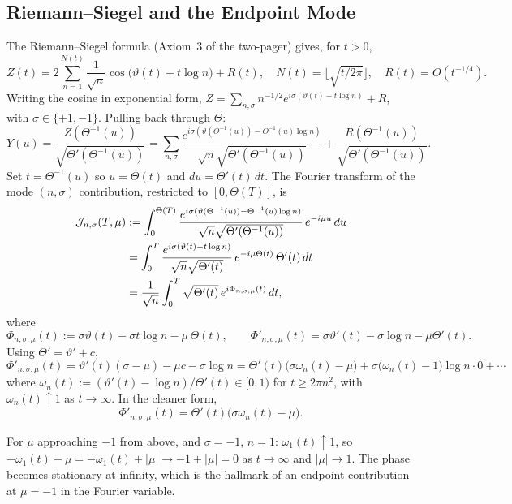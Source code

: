 \documentclass[11pt,a4paper]{article}
\theoremstyle{plain}
\theoremstyle{definition}
\begin{document}
\subsection{Riemann--Siegel and the Endpoint Mode}

The Riemann--Siegel formula (Axiom~3 of the two-pager) gives, for $t>0$,
\[
Z(t)=2\sum_{n=1}^{N(t)}\frac{1}{\sqrt n}\cos\!\big(\vartheta(t)-t\log n\big)+R(t),
\quad N(t)=\lfloor\sqrt{t/2\pi}\rfloor,
\quad R(t)=O(t^{-1/4}).
\]
Writing the cosine in exponential form, $Z=\sum_{n,\sigma}n^{-1/2}e^{i\sigma(\vartheta(t)-t\log n)}+R$, with $\sigma\in\{+1,-1\}$. Pulling back through $\Theta$:
\[
Y(u)=\frac{Z(\Theta^{-1}(u))}{\sqrt{\Theta'(\Theta^{-1}(u))}}
=\sum_{n,\sigma}\frac{e^{i\sigma(\vartheta(\Theta^{-1}(u))-\Theta^{-1}(u)\log n)}}{\sqrt{n}\sqrt{\Theta'(\Theta^{-1}(u))}}
+\frac{R(\Theta^{-1}(u))}{\sqrt{\Theta'(\Theta^{-1}(u))}}.
\]
Set $t=\Theta^{-1}(u)$ so $u=\Theta(t)$ and $du=\Theta'(t)\,dt$. The Fourier transform of the mode $(n,\sigma)$ contribution, restricted to $[0,\Theta(T)]$, is
\begin{align}
\mathcal{J}_{n,\sigma}(T,\mu)
&:=\int_0^{\Theta(T)}\frac{e^{i\sigma(\vartheta(\Theta^{-1}(u))-\Theta^{-1}(u)\log n)}}{\sqrt{n}\sqrt{\Theta'(\Theta^{-1}(u))}}\,e^{-i\mu u}\,du\notag\\
&=\int_0^{T}\frac{e^{i\sigma(\vartheta(t)-t\log n)}}{\sqrt{n}\sqrt{\Theta'(t)}}\,e^{-i\mu\Theta(t)}\,\Theta'(t)\,dt\notag\\
&=\frac{1}{\sqrt n}\int_0^T\sqrt{\Theta'(t)}\,e^{i\Phi_{n,\sigma,\mu}(t)}\,dt,\label{eq:Jnsigma}
\end{align}
where
\[
\Phi_{n,\sigma,\mu}(t):=\sigma\vartheta(t)-\sigma t\log n-\mu\,\Theta(t),
\qquad
\Phi'_{n,\sigma,\mu}(t)=\sigma\vartheta'(t)-\sigma\log n-\mu\Theta'(t).
\]
Using $\Theta'=\vartheta'+c$,
\begin{equation}\label{eq:Phiprime}
\Phi'_{n,\sigma,\mu}(t)=\vartheta'(t)(\sigma-\mu)-\mu c-\sigma\log n
=\Theta'(t)\big(\sigma\omega_n(t)-\mu\big)+\sigma\big(\omega_n(t)-1\big)\log n\cdot 0+\cdots
\end{equation}
where $\omega_n(t):=(\vartheta'(t)-\log n)/\Theta'(t)\in[0,1)$ for $t\ge 2\pi n^2$, with $\omega_n(t)\uparrow 1$ as $t\to\infty$. In the cleaner form,
\begin{equation}\label{eq:PhiprimeC}
\Phi'_{n,\sigma,\mu}(t)=\Theta'(t)\big(\sigma\omega_n(t)-\mu\big).
\end{equation}

For $\mu$ approaching $-1$ from above, and $\sigma=-1$, $n=1$: $\omega_1(t)\uparrow 1$, so $-\omega_1(t)-\mu=-\omega_1(t)+|\mu|\to -1+|\mu|=0$ as $t\to\infty$ and $|\mu|\to 1$. The phase becomes stationary at infinity, which is the hallmark of an endpoint contribution at $\mu=-1$ in the Fourier variable.
\end{document}
